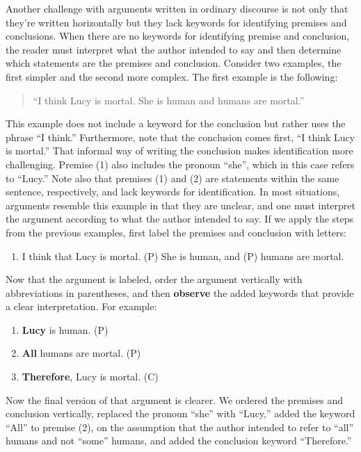 \documentclass[
]{book}
\providecommand{\tightlist}{%
  \setlength{\itemsep}{0pt}\setlength{\parskip}{0pt}}
\begin{document}
\begin{reflect}
Another challenge with arguments written in ordinary discourse is not only that they're written horizontally but they lack keywords for identifying premises and conclusions. When there are no keywords for identifying premise and conclusion, the reader must interpret what the author intended to say and then determine which statements are the premises and conclusion. Consider two examples, the first simpler and the second more complex. The first example is the following:

\begin{quote}
``I think Lucy is mortal. She is human and humans are mortal.''
\end{quote}

This example does not include a keyword for the conclusion but rather uses the phrase ``I think.'' Furthermore, note that the conclusion comes first, ``I think Lucy is mortal.'' That informal way of writing the conclusion makes identification more challenging. Premise (1) also includes the pronoun ``she'', which in this case refers to ``Lucy.'' Note also that premises (1) and (2) are statements within the same sentence, respectively, and lack keywords for identification. In most situations, arguments resemble this example in that they are unclear, and one must interpret the argument according to what the author intended to say. If we apply the steps from the previous examples, first label the premises and conclusion with letters:

\begin{enumerate}
\def\labelenumi{(\Alph{enumi})}
\setcounter{enumi}{2}
\tightlist
\item
  I think that Lucy is mortal. (P) She is human, and (P) humans are mortal.
\end{enumerate}

Now that the argument is labeled, order the argument vertically with abbreviations in parentheses, and then \textbf{observe} the added keywords that provide a clear interpretation. For example:

\begin{enumerate}
\def\labelenumi{\arabic{enumi}.}
\tightlist
\item
  \textbf{Lucy} is human. (P)
\item
  \textbf{All} humans are mortal. (P)
\item
  \textbf{Therefore}, Lucy is mortal. (C)
\end{enumerate}

Now the final version of that argument is clearer. We ordered the premises and conclusion vertically, replaced the pronoun ``she'' with ``Lucy,'' added the keyword ``All'' to premise (2), on the assumption that the author intended to refer to ``all'' humans and not ``some'' humans, and added the conclusion keyword ``Therefore.''


\end{reflect}
\end{document}
